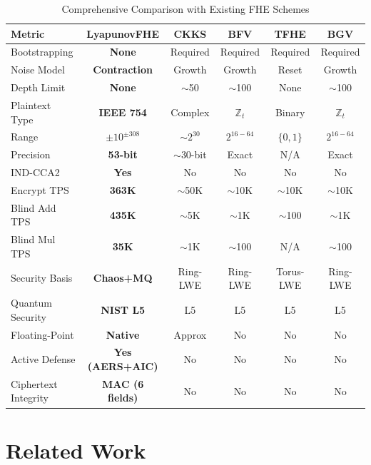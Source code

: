\documentclass[11pt,a4paper]{article}
\begin{document}
\begin{table}[H]
\centering
\caption{Comprehensive Comparison with Existing FHE Schemes}
\label{tab:comparison_full}
\begin{tabular}{@{}lccccc@{}}
\toprule
\textbf{Metric} & \textbf{LyapunovFHE} & \textbf{CKKS} & \textbf{BFV} & \textbf{TFHE} & \textbf{BGV} \\
\midrule
Bootstrapping & \textbf{None} & Required & Required & Required & Required \\
Noise Model & \textbf{Contraction} & Growth & Growth & Reset & Growth \\
Depth Limit & \textbf{None} & $\sim$50 & $\sim$100 & None & $\sim$100 \\
Plaintext Type & \textbf{IEEE 754} & Complex & $\mathbb{Z}_t$ & Binary & $\mathbb{Z}_t$ \\
Range & \textbf{$\pm 10^{\pm 308}$} & $\sim 2^{30}$ & $2^{16-64}$ & $\{0,1\}$ & $2^{16-64}$ \\
Precision & \textbf{53-bit} & $\sim$30-bit & Exact & N/A & Exact \\
IND-CCA2 & \textbf{Yes} & No & No & No & No \\
Encrypt TPS & \textbf{363K} & $\sim$50K & $\sim$10K & $\sim$10K & $\sim$10K \\
Blind Add TPS & \textbf{435K} & $\sim$5K & $\sim$1K & $\sim$100 & $\sim$1K \\
Blind Mul TPS & \textbf{35K} & $\sim$1K & $\sim$100 & N/A & $\sim$100 \\
Security Basis & \textbf{Chaos+MQ} & Ring-LWE & Ring-LWE & Torus-LWE & Ring-LWE \\
Quantum Security & \textbf{NIST L5} & L5 & L5 & L5 & L5 \\
Floating-Point & \textbf{Native} & Approx & No & No & No \\
Active Defense & \textbf{Yes (AERS+AIC)} & No & No & No & No \\
Ciphertext Integrity & \textbf{MAC (6 fields)} & No & No & No & No \\
\bottomrule
\end{tabular}
\end{table}

\newpage

\section{Related Work}
\label{sec:related}
\end{document}
